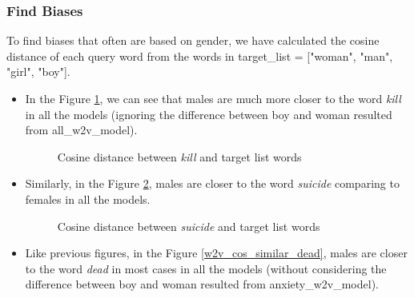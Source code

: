 \documentclass[12pt, a4paper]{article}
\begin{document}
	\subsubsection{Find Biases}
	To find biases that often are based on gender, we have calculated the cosine distance of each query word from the words in target\_list = ["woman", "man", "girl", "boy"].
	\begin{itemize}
		\item In the Figure \ref{w2v_cos_similar_kill}, we can see that males are much more closer to the word \emph{kill} in all the models (ignoring the difference between boy and woman resulted from all\_w2v\_model).
		
		\begin{figure}[H]
			\caption{Cosine distance between \emph{kill} and target list words}
			\label{w2v_cos_similar_kill}
		\end{figure}
		
		\vspace{5mm}
	
		\item Similarly, in the Figure \ref{w2v_cos_similar_suicide}, males are closer to the word \emph{suicide} comparing to females in all the models.
		
		\begin{figure}[H]
			\caption{Cosine distance between \emph{suicide} and target list words}
			\label{w2v_cos_similar_suicide}
		\end{figure}
	
		\vspace{5mm}
		
		\item Like previous figures, in the Figure \ref{w2v_cos_similar_dead}, males are closer to the word \emph{dead} in most cases in all the models (without considering the difference between boy and woman resulted from anxiety\_w2v\_model).
		

\end{itemize}
\end{document}
